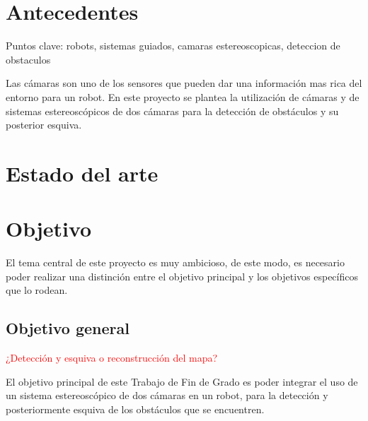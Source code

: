 



\section{Antecedentes}
\label{1:sec:1}

Puntos clave: robots, sistemas guiados, camaras estereoscopicas, deteccion de
obstaculos

Las cámaras son uno de los sensores que pueden dar una información mas
rica del entorno para un robot. En este proyecto se plantea la utilización de
cámaras y de sistemas estereoscópicos de dos cámaras para la detección de
obstáculos y su posterior esquiva.


\section{Estado del arte}
\label{1:sec:2}


\section{Objetivo}
\label{1:sec:3}

El tema central de este proyecto es muy ambicioso, de este modo, es necesario
poder realizar una distinción entre el objetivo principal y los objetivos
específicos que lo rodean.

\subsection{Objetivo general}

\textcolor{red}{¿Detección y esquiva o reconstrucción del mapa?}

El objetivo principal de este Trabajo de Fin de Grado es poder integrar el uso
de un sistema estereoscópico de dos cámaras en un robot, para la detección y
posteriormente esquiva de los obstáculos que se encuentren.

